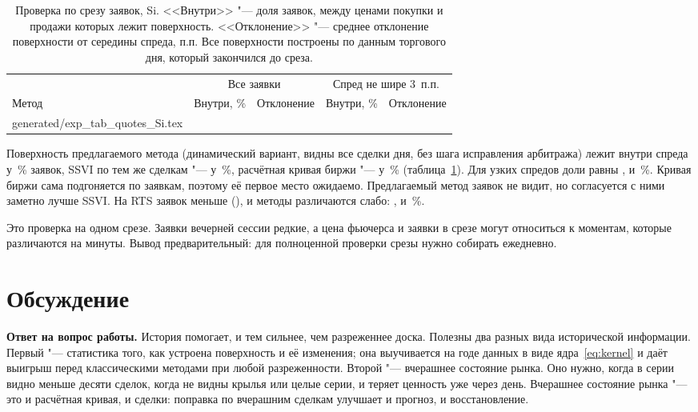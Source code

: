 \documentclass{article}
\makeatletter
\newcommand{\rows}[1]{\@@input generated/#1 }
\makeatother
\begin{document}
\begin{table}[h]
\caption{Проверка по срезу заявок, Si. <<Внутри>> "--- доля заявок, между ценами покупки и продажи которых лежит поверхность. <<Отклонение>> "--- среднее отклонение поверхности от середины спреда, п.п. Все поверхности построены по данным торгового дня, который закончился до среза.}\label{tab:quotes}
\centering\footnotesize
\begin{tabular}{lrrrr}
\toprule
 & \multicolumn{2}{c}{Все заявки} & \multicolumn{2}{c}{Спред не шире 3~п.п.} \\
\cmidrule(lr){2-3}\cmidrule(lr){4-5}
Метод & Внутри, \% & Отклонение & Внутри, \% & Отклонение \\
\midrule
\rows{exp_tab_quotes_Si.tex}
\bottomrule
\end{tabular}
\end{table}

Поверхность предлагаемого метода (динамический вариант, видны все сделки дня, без шага исправления арбитража) лежит внутри спреда у \,\% заявок, SSVI по тем же сделкам "--- у \,\%, расчётная кривая биржи "--- у \,\% (таблица~\ref{tab:quotes}). Для узких спредов доли равны ,  и \,\%. Кривая биржи сама подгоняется по заявкам, поэтому её первое место ожидаемо. Предлагаемый метод заявок не видит, но согласуется с ними заметно лучше SSVI. На RTS заявок меньше (), и методы различаются слабо: ,  и \,\%.

Это проверка на одном срезе. Заявки вечерней сессии редкие, а цена фьючерса и заявки в срезе могут относиться к моментам, которые различаются на минуты. Вывод предварительный: для полноценной проверки срезы нужно собирать ежедневно.

\section{Обсуждение}\label{sec:disc}

\textbf{Ответ на вопрос работы.} История помогает, и тем сильнее, чем разреженнее доска. Полезны два разных вида исторической информации. Первый "--- статистика того, как устроена поверхность и её изменения; она выучивается на годе данных в виде ядра~\eqref{eq:kernel} и даёт выигрыш перед классическими методами при любой разреженности. Второй "--- вчерашнее состояние рынка. Оно нужно, когда в серии видно меньше десяти сделок, когда не видны крылья или целые серии, и теряет ценность уже через день. Вчерашнее состояние рынка "--- это и расчётная кривая, и сделки: поправка по вчерашним сделкам улучшает и прогноз, и восстановление.
\end{document}
